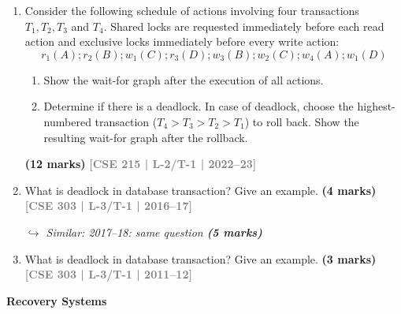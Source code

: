 \documentclass[12pt,a3paper]{article}
\newcommand{\yr}[1]{\hfill\textcolor{gray}{\small\textbf{[#1]}}}
\newcommand{\mk}[1]{\textcolor{orange!70!black}{\small\textbf{(#1 marks)}}}
\newcommand{\variant}[1]{\par\vspace{1pt}\textcolor{blue!50!black}%
  {\footnotesize\textit{$\hookrightarrow$ Similar: #1}}}
\newcommand{\subtopic}[2]{%
  \vspace{10pt}
  \noindent\begin{tcolorbox}[colback=#1!8,colframe=#1,boxrule=0.6pt,arc=4pt,
    left=6pt,right=6pt,top=4pt,bottom=4pt]
    \small\bfseries\textcolor{#1}{#2}
  \end{tcolorbox}
  \vspace{2pt}
}
\begin{document}
\begin{enumerate}
\item Consider the following schedule of actions involving four transactions $T_1, T_2, T_3$ and $T_4$. Shared locks are requested immediately before each read action and exclusive locks immediately before every write action:
\[r_1(A); r_2(B); w_1(C); r_3(D); w_3(B); w_2(C); w_4(A); w_1(D)\]
\begin{enumerate}
  \item Show the wait-for graph after the execution of all actions.
  \item Determine if there is a deadlock. In case of deadlock, choose the highest-numbered transaction ($T_4 > T_3 > T_2 > T_1$) to roll back. Show the resulting wait-for graph after the rollback.
\end{enumerate}
  \mk{12} \yr{CSE 215 | L-2/T-1 | 2022--23}

\item What is deadlock in database transaction? Give an example.
\mk{4} \yr{CSE 303 | L-3/T-1 | 2016--17}

\variant{2017--18: same question \mk{5}}

\item What is deadlock in database transaction? Give an example.
\mk{3} \yr{CSE 303 | L-3/T-1 | 2011--12}

\end{enumerate}

\subtopic{cE}{Recovery Systems}
\label{sub:s7-recovery}
\end{document}

